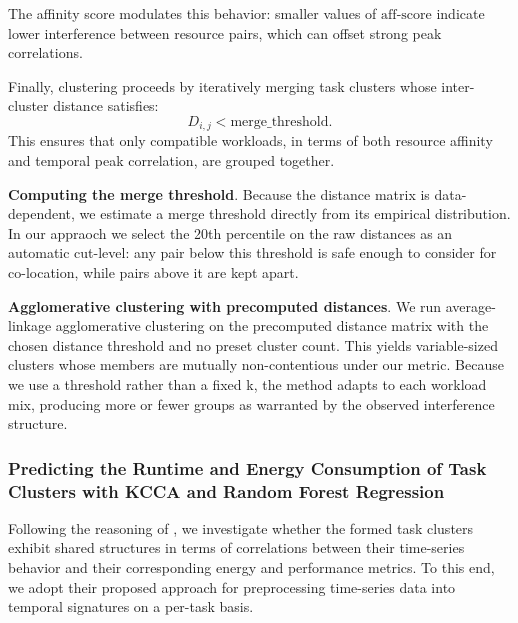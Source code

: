 The affinity score modulates this behavior:
smaller values of \( \mathrm{aff\text{-}score} \)
indicate lower interference between resource pairs,
which can offset strong peak correlations.

Finally, clustering proceeds by iteratively merging task clusters
whose inter-cluster distance satisfies:
\[
    D_{i,j} < \text{merge\_threshold}.
\]
This ensures that only compatible workloads, in terms of both
resource affinity and temporal peak correlation, are grouped together.

\textbf{Computing the merge threshold}. Because the distance matrix is data-dependent, we estimate a merge threshold directly from its empirical distribution. In our appraoch we select the 20th percentile on the raw distances as an automatic cut-level: any pair below this threshold is safe enough to consider for co-location, while pairs above it are kept apart.

\textbf{Agglomerative clustering with precomputed distances}. We run average-linkage agglomerative clustering on the precomputed distance matrix with the chosen distance threshold and no preset cluster count. This yields variable-sized clusters whose members are mutually non-contentious under our metric. Because we use a threshold rather than a fixed k, the method adapts to each workload mix, producing more or fewer groups as warranted by the observed interference structure.



\subsubsection{Predicting the Runtime and Energy Consumption of Task Clusters with KCCA and Random Forest Regression}
\label{sec:prediciton_kcca_rfr}

Following the reasoning of \cite{5644899}, we investigate whether the formed task clusters exhibit shared structures in terms of correlations between their time-series behavior and their corresponding energy and performance metrics. To this end, we adopt their proposed approach for preprocessing time-series data into temporal signatures on a per-task basis.

